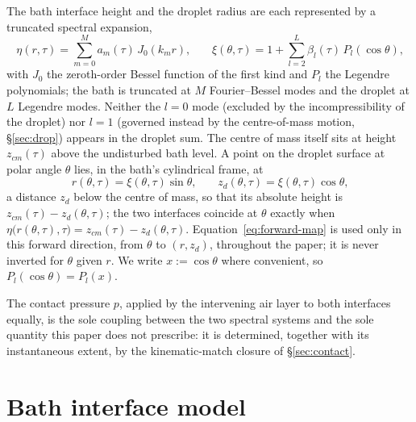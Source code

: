 The bath interface height and the droplet radius are each represented by a truncated spectral expansion,
\begin{equation}
    \eta(r,\tau) = \sum_{m=0}^{M} a_m(\tau)\,J_0(k_mr)\text{,}\qquad
    \xi(\theta,\tau) = 1+\sum_{l=2}^{L}\beta_l(\tau)\,P_l(\cos\theta)\text{,}
    \label{eq:eta-xi}
\end{equation}
with $J_0$ the zeroth-order Bessel function of the first kind and $P_l$ the Legendre polynomials; the bath is truncated at $M$ Fourier--Bessel modes and the droplet at $L$ Legendre modes. Neither the $l=0$ mode (excluded by the incompressibility of the droplet) nor $l=1$ (governed instead by the centre-of-mass motion, \S\ref{sec:drop}) appears in the droplet sum. The centre of mass itself sits at height $z_{cm}(\tau)$ above the undisturbed bath level. A point on the droplet surface at polar angle $\theta$ lies, in the bath's cylindrical frame, at
\begin{equation}
    r(\theta,\tau) = \xi(\theta,\tau)\sin\theta\text{,}\qquad
    z_d(\theta,\tau) = \xi(\theta,\tau)\cos\theta\text{,}
    \label{eq:forward-map}
\end{equation}
a distance $z_d$ below the centre of mass, so that its absolute height is $z_{cm}(\tau)-z_d(\theta,\tau)$; the two interfaces coincide at $\theta$ exactly when $\eta\big(r(\theta,\tau),\tau\big)=z_{cm}(\tau)-z_d(\theta,\tau)$. Equation~\eqref{eq:forward-map} is used only in this forward direction, from $\theta$ to $(r,z_d)$, throughout the paper; it is never inverted for $\theta$ given $r$. We write $x:=\cos\theta$ where convenient, so $P_l(\cos\theta)=P_l(x)$.

The contact pressure $p$, applied by the intervening air layer to both interfaces equally, is the sole coupling between the two spectral systems and the sole quantity this paper does not prescribe: it is determined, together with its instantaneous extent, by the kinematic-match closure of \S\ref{sec:contact}.

\section{Bath interface model}
\label{sec:bath}

